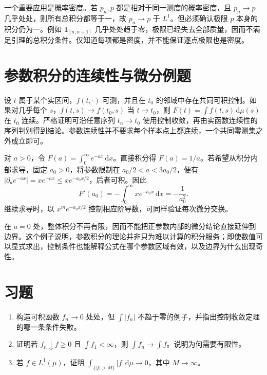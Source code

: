 一个重要应用是概率密度。若 $p_n,p$ 都是相对于同一测度的概率密度，且 $p_n\to p$ 几乎处处，则所有总积分都等于一，故 $p_n\to p$ 于 $L^1$。但必须确认极限 $p$ 本身的积分仍为一。例如 $\mathbf1_{[n,n+1]}$ 几乎处处趋于零，极限已经失去全部质量，因而不满足引理的总积分条件。仅知道每项都是密度，并不能保证逐点极限也是密度。

\section{参数积分的连续性与微分例题}
设 $t$ 属于某个实区间，$f(t,\cdot)$ 可测，并且在 $t_0$ 的邻域中存在共同可积控制。如果对几乎每个 $s$，$f(t,s)\to f(t_0,s)$ 当 $t\to t_0$，则 $F(t)=\int f(t,s)\,\mathrm d\mu(s)$ 在 $t_0$ 连续。严格证明可沿任意序列 $t_n\to t_0$ 使用控制收敛，再由实函数连续性的序列判别得到结论。参数连续性并不要求每个样本点上都连续，一个共同零测集之外成立即可。

\begin{example}[拉普拉斯型积分]
对 $a>0$，令 $F(a)=\int_0^\infty e^{-ax}\,\mathrm dx$。直接积分得 $F(a)=1/a$。若希望从积分内部求导，固定 $a_0>0$，将参数限制在 $a_0/2<a<3a_0/2$，便有
$|\partial_ae^{-ax}|=xe^{-ax}\leq xe^{-a_0x/2}$，后者可积。因此
\[
 F'(a_0)=-\int_0^\infty xe^{-a_0x}\,\mathrm dx=-\frac1{a_0^2}.
\]
继续求导时，以 $x^me^{-a_0x/2}$ 控制相应阶导数，可同样验证每次微分交换。
\end{example}

在 $a=0$ 处，整体积分不再有限，因而不能把正参数内部的微分结论直接延伸到边界。这个例子说明，参数积分的理论并非只为难以计算的积分服务；即使数值可以显式求出，控制条件也能解释公式在哪个参数区域有效，以及边界为什么出现奇性。

\section{习题}
\begin{enumerate}
 \item 构造可积函数 $f_n\to0$ 处处，但 $\int|f_n|$ 不趋于零的例子，并指出控制收敛定理的哪一条条件失败。
 \item 证明若 $f_n\downarrow f\geq0$ 且 $\int f_1<\infty$，则 $\int f_n\to\int f$。说明为何需要有限性。
 \item 若 $f\in L^1(\mu)$，证明 $\int_{\{|f|>M\}}|f|\,\mathrm d\mu\to0$，其中 $M\to\infty$。
\end{enumerate}

